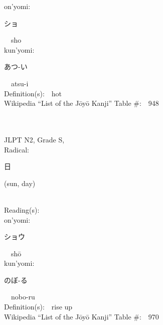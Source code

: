 \begin{multicols}{2}
{\hspace*{1em}}on'yomi:\ \ \\
{\hspace*{2em}}{\begin{CJK}{UTF8}{min} ショ \end{CJK}}\ \ sho\ \ \\
{\hspace*{1em}}kun'yomi:\ \ \\
{\hspace*{2em}}{\begin{CJK}{UTF8}{min} あつ-い \end{CJK}}\ \ atsu-i\ \ \\
Definition(s):\ \ hot \\
Wikipedia ``List of the J\=oy\=o Kanji'' Table \#:\ \ 948 \\
\ \ \\
{\fontsize{34pt}{40pt}  }\ \ \\  %
{JLPT N2, Grade S, \\Radical:\ \ {\begin{CJK}{UTF8}{min} 日 \end{CJK}} (sun, day) } \\
Reading(s):\ \ \\
{\hspace*{1em}}on'yomi:\ \ \\
{\hspace*{2em}}{\begin{CJK}{UTF8}{min} ショウ \end{CJK}}\ \ sh\=o\ \ \\
{\hspace*{1em}}kun'yomi:\ \ \\
{\hspace*{2em}}{\begin{CJK}{UTF8}{min} のぼ-る \end{CJK}}\ \ nobo-ru\ \ \\
Definition(s):\ \ rise up \\
Wikipedia ``List of the J\=oy\=o Kanji'' Table \#:\ \ 970 \\
\ \ \\
{\fontsize{34pt}{40pt}  }\ \ \\  %

\end{multicols}
